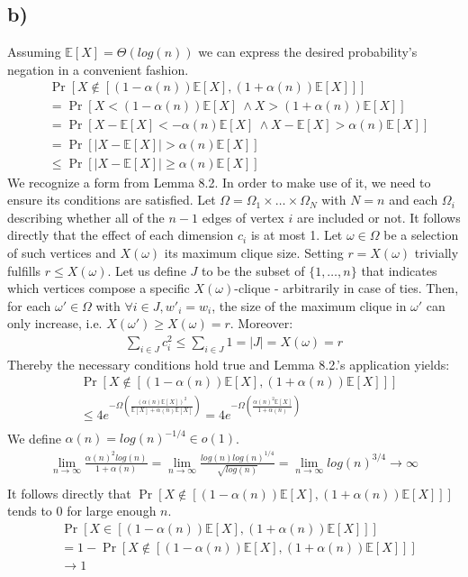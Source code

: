\documentclass[a4paper,german]{article}
\newcommand{\E}{\mathbb{E}}
\begin{document}
\subsection*{b)}
Assuming \(\E[X] = \Theta(log(n))\) we can express the desired probability's negation in a convenient fashion.
\begin{align*}
&\Pr[X \notin  [(1 - \alpha(n)) \E[X], (1 + \alpha(n)) \E[X]]] \\
&= \Pr[X < (1 - \alpha(n)) \E[X]\ \wedge  X > (1 + \alpha(n)) \E[X]] \\
&= \Pr[X - \E[X] < - \alpha(n) \E[X]\ \wedge X - \E[X] > \alpha(n) \E[X]] \\
&= \Pr[|X - \E[X]| > \alpha(n)\E[X]] \\
& \leq \Pr[|X - \E[X]| \geq \alpha(n)\E[X]]
\end{align*}
We recognize a form from Lemma 8.2. In order to make use of it, we need to ensure its conditions are satisfied. Let \( \Omega = \Omega_1 \times \dots \times \Omega_N\) with \(N = n\) and each \(\Omega_i\) describing whether all of the \(n-1\) edges of vertex \(i\) are included or not. It follows directly that the effect of each dimension \(c_i\) is at most 1. Let \(\omega \in \Omega\) be a selection of such vertices and \(X(\omega)\) its maximum clique size. Setting \(r = X(\omega)\) trivially fulfills \(r \leq X(\omega)\). Let us define \(J\) to be the subset of \(\{1, \dots, n\}\) that indicates which vertices compose a specific \(X(\omega)\)-clique - arbitrarily in case of ties. Then, for each \(\omega' \in \Omega\) with \(\forall i \in J, w'_i = w_i\), the size of the maximum clique in \(\omega'\) can only increase, i.e. \(X(\omega') \geq X(\omega) = r\). Moreover:
\begin{align*}
 \sum_{i \in J} c_i^2 \leq \sum_{i \in J} 1 = |J| = X(\omega) = r
 \end{align*}
Thereby the necessary conditions hold true and Lemma 8.2.'s application yields:
\begin{align*}
&\Pr[X \notin  [(1 - \alpha(n)) \E[X], (1 + \alpha(n)) \E[X]]] \\
&\leq 4 e^{- \Omega(\frac{(\alpha(n)\E[X])^2}{\E[X] + \alpha(n) \E[X]})} =  4 e^{- \Omega(\frac{\alpha(n)^2\E[X]}{1 + \alpha(n)})}\\
\end{align*}
We define \(\alpha(n) = log(n) ^ {-1/4} \in o(1)\). 
\begin{align*}
\lim_{n \to \infty} \frac{\alpha(n)^2 log(n)}{1 + \alpha(n)} = \lim_{n \to \infty} \frac{log(n)log(n)^{1/4}}{\sqrt{log(n)}} = \lim_{n \to \infty} log(n)^{3/4} \to \infty\\
\end{align*}
It follows directly that \(\Pr[X \notin  [(1 - \alpha(n)) \E[X], (1 + \alpha(n)) \E[X]]] \) tends to 0 for large enough \(n\).
\begin{align*}
&\Pr[X \in  [(1 - \alpha(n)) \E[X], (1 + \alpha(n)) \E[X]]]  \\
&= 1 - \Pr[X \notin  [(1 - \alpha(n)) \E[X], (1 + \alpha(n)) \E[X]]] \\
& \to 1
\end{align*}
\end{document}
